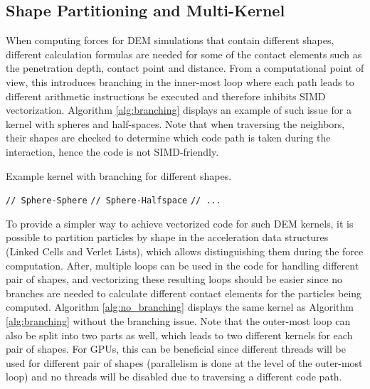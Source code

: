 \documentclass[Afour,sageh,times]{sagej}
\newcommand{\RMchange}[1]{{\color{blue} #1}}
\begin{document}
\subsection{Shape Partitioning and Multi-Kernel}
\label{sec:shape_partitioning}

When computing forces for DEM simulations that contain different shapes, different calculation formulas are needed for some of the contact elements such as the penetration depth, contact point and distance.
From a computational point of view, this introduces branching in the inner-most loop where each path leads to different arithmetic instructions be executed and therefore inhibits SIMD vectorization.
Algorithm \ref{alg:branching} displays an example of such issue for a kernel with spheres and half-spaces.
Note that when traversing the neighbors, their shapes are checked to determine which code path is taken during the interaction, hence the code is not SIMD-friendly.

\begin{algorithm}[H]
  \caption{Example kernel with branching for different shapes.}
  \label{alg:branching}
  \begin{algorithmic}[1]
          \State \texttt{// Sphere-Sphere}
        \EndIf
          \State \texttt{// Sphere-Halfspace}
        \EndIf
        \State \texttt{// ...}
      \EndFor
    \EndFor
  \end{algorithmic}
\end{algorithm}

To provide a simpler way to achieve vectorized code for such DEM kernels, \RMchange{it is possible to} partition particles by shape in the acceleration data structures (Linked Cells and Verlet Lists), which allows distinguishing them during the force computation.
After, \RMchange{multiple loops can be used} in the code for handling different pair of shapes, \RMchange{and} \RMchange{vectorizing} these resulting loops should be easier since no branches are needed to calculate different contact elements for the particles being computed.
Algorithm \ref{alg:no_branching} displays the same kernel as Algorithm \ref{alg:branching} without the branching issue.
Note that the outer-most loop can also be split into two parts as well, which leads to two different kernels for each pair of shapes.
For GPUs, this can be beneficial since different threads will be used for different pair of shapes (parallelism is done at the level of the outer-most loop) and no threads will be disabled due to traversing a different code path.
\end{document}
